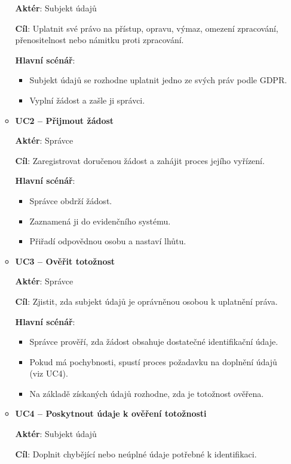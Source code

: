 \begin{itemize}
\begin{itemize}
    \textbf{Aktér}: Subjekt údajů

    \textbf{Cíl}: Uplatnit své právo na přístup, opravu, výmaz, omezení zpracování, přenositelnost nebo námitku proti zpracování.

    \textbf{Hlavní scénář}: 
    \begin{itemize}
        \item Subjekt údajů se rozhodne uplatnit jedno ze svých práv podle GDPR.
        \item Vyplní žádost a zašle ji správci.
    \end{itemize}

    \item \textbf{UC2 – Přijmout žádost}

    \textbf{Aktér}: Správce

    \textbf{Cíl}: Zaregistrovat doručenou žádost a zahájit proces jejího vyřízení.

    \textbf{Hlavní scénář}: 
    \begin{itemize}
        \item Správce obdrží žádost.
        \item Zaznamená ji do evidenčního systému.
        \item Přiřadí odpovědnou osobu a nastaví lhůtu.
    \end{itemize}

    \item \textbf{UC3 – Ověřit totožnost}

    \textbf{Aktér}: Správce

    \textbf{Cíl}: Zjistit, zda subjekt údajů je oprávněnou osobou k uplatnění práva.

    \textbf{Hlavní scénář}: 
    \begin{itemize}
        \item Správce prověří, zda žádost obsahuje dostatečné identifikační údaje.
        \item Pokud má pochybnosti, spustí proces požadavku na doplnění údajů (viz UC4).
        \item Na základě získaných údajů rozhodne, zda je totožnost ověřena.
    \end{itemize}

    \item \textbf{UC4 – Poskytnout údaje k ověření totožnosti}

    \textbf{Aktér}: Subjekt údajů

    \textbf{Cíl}: Doplnit chybějící nebo neúplné údaje potřebné k identifikaci.


\end{itemize}
\end{itemize}
